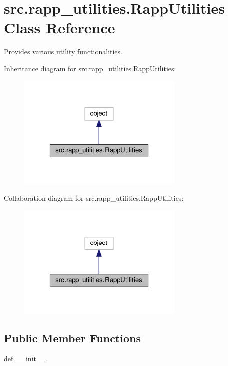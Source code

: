 \hypertarget{classsrc_1_1rapp__utilities_1_1RappUtilities}{\section{src.\-rapp\-\_\-utilities.\-Rapp\-Utilities Class Reference}
\label{classsrc_1_1rapp__utilities_1_1RappUtilities}
}


Provides various utility functionalities.  




Inheritance diagram for src.\-rapp\-\_\-utilities.\-Rapp\-Utilities\-:
\nopagebreak
\begin{figure}[H]
\begin{center}
\leavevmode
\includegraphics[width=226pt]{classsrc_1_1rapp__utilities_1_1RappUtilities__inherit__graph}
\end{center}
\end{figure}


Collaboration diagram for src.\-rapp\-\_\-utilities.\-Rapp\-Utilities\-:
\nopagebreak
\begin{figure}[H]
\begin{center}
\leavevmode
\includegraphics[width=226pt]{classsrc_1_1rapp__utilities_1_1RappUtilities__coll__graph}
\end{center}
\end{figure}
\subsection*{Public Member Functions}
\begin{DoxyCompactItemize}
\item 
def \hyperlink{classsrc_1_1rapp__utilities_1_1RappUtilities_a27a307e1b9ee07057a04e64ca9d77c01}{\-\_\-\-\_\-init\-\_\-\-\_\-}
\end{DoxyCompactItemize}
